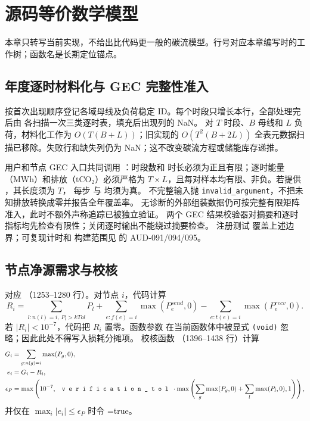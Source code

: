 \section{源码等价数学模型}
本章只转写当前实现，不给出比代码更一般的碳流模型。行号对应本章编写时的工作树；函数名是长期定位锚点。

\subsection{年度逐时材料化与 GEC 完整性准入}
按首次出现顺序登记各域母线及负荷稳定 ID。每个时段只增长本行，全部处理完后由
 各扫描一次三类逐时表，填充后出现列的 NaN。
对 $T$ 时段、$B$ 母线和 $L$ 负荷，材料化工作为 $O(T(B+L))$；旧实现的
$O(T^2(B+2L))$ 全表元数据扫描已移除。失败行和缺失列仍为 NaN；这不改变碳流方程或储能库存递推。

用户和节点 GEC 入口共同调用 ：时段数和
时长必须为正且有限；逐时能量（MWh）和排放（tCO$_2$）必须严格为
$T\times L$，且每对样本均有限、非负。若提供 ，其长度须为 $T$，
每步  与  均须为真。
不完整输入抛 \texttt{invalid\_argument}，不把未知排放转换成零并报告全年覆盖率。
无诊断的外部组装数据仍可按完整有限矩阵准入，此时不额外声称追踪已被独立验证。
两个 GEC 结果校验器对摘要和逐时指标均先检查有限性；关闭逐时输出不能绕过摘要检查。
注册测试  覆盖上述边界；可复现计时和
构建范围见  的 AUD-091/094/095。

\subsection{节点净源需求与校核}
对应 
（1253--1280 行）。对节点 $i$，代码计算
\begin{equation}
R_i=\sum_{l:n(l)=i,\,P_l>kTol}P_l
+\sum_{e:f(e)=i}\max(P_e^{send},0)
-\sum_{e:t(e)=i}\max(P_e^{recv},0).
\end{equation}
若 $|R_i|<10^{-7}$，代码把 $R_i$ 置零。函数参数
 在当前函数体中被显式 \texttt{(void)} 忽略；因此此处不得写入损耗分摊项。
校核函数 （1396--1438 行）计算
\begin{align}
G_i&=\sum_{g:n(g)=i}\max(P_g,0),\\
e_i&=G_i-R_i,\\
\epsilon_P&=\max\left(10^{-7},\ \fld{verification\_tol}\cdot
\max\left(\sum_g\max(P_g,0)+\sum_l\max(P_l,0),1\right)\right),
\end{align}
并仅在 $\max_i|e_i|\le\epsilon_P$ 时令 =true。

